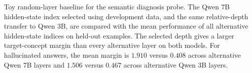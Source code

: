 \caption{Toy random-layer baseline for the semantic diagnosis probe.
The Qwen 7B hidden-state index selected using development data, and
the same relative-depth transfer to Qwen 3B, are compared with the
mean performance of all alternative hidden-state indices on held-out
examples. The selected depth gives a larger target-concept margin than
every alternative layer on both models. For hallucinated answers, the
mean margin is $1.910$ versus $0.408$ across alternative Qwen 7B layers
and $1.506$ versus $0.467$ across alternative Qwen 3B layers.}
